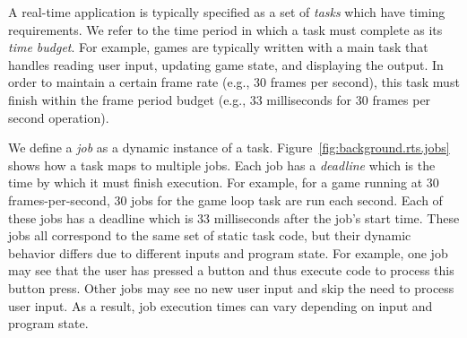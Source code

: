 A real-time application is typically specified as a set of \emph{tasks}
which have timing requirements. We refer to the time period in which a task
must complete as its \emph{time budget}. For example, games are typically
written with a main task that handles reading user input, updating game state,
and displaying the output. In order to maintain a certain frame rate (e.g., 30
frames per second), this task must finish within the frame period budget (e.g.,
33 milliseconds for 30 frames per second operation).

We define a \emph{job} as a dynamic instance of a task.
Figure~\ref{fig:background.rts.jobs} shows how a task maps
to multiple jobs. Each job has a \emph{deadline} which is the time by which it must
finish execution. For example, for a game running at 30 frames-per-second, 30
jobs for the game loop task are run each second. Each of these jobs has a
deadline which is 33 milliseconds after the job's start time. These jobs all
correspond to the same set of static task code, but their dynamic behavior
differs due to different inputs and program state. For example, one job may see
that the user has pressed a button and thus execute code to process this button
press. Other jobs may see no new user input and skip the need to process user
input.  As a result, job execution times can vary depending on input and
program state.

